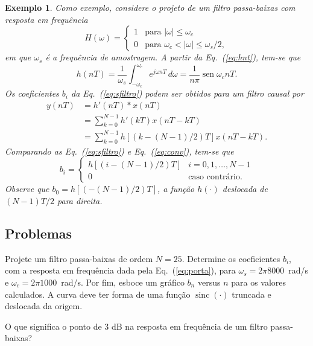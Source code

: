 \documentclass[12pt,addpoints]{exam}
\newtheorem{exemplo}{Exemplo}[section]
\begin{document}
\begin{exemplo} \label{ex:1}
    Como exemplo, considere o projeto de um filtro passa-baixas com resposta em frequência
    \begin{equation} \label{eq:porta}
        H(\omega) = \begin{cases}
        	1 & \text{para } |\omega| \leq \omega_c              \\
        	0 & \text{para } \omega_c < |\omega| \leq \omega_s/2,
        \end{cases}
    \end{equation}
    em que $\omega_s$ é a frequência de amostragem. A partir da Eq.~(\ref{eq:hnt}), tem-se que
    \begin{equation} \label{eq:hntfpb}
        h(nT) = \frac{1}{\omega_s} \int_{-\omega_c}^{\omega_c} e^{j\omega nT} \, d\omega = \frac{1}{n\pi} \operatorname{sen}{\omega_cnT}.
    \end{equation}
    Os coeficientes $b_i$ da Eq.~(\ref{eq:sfiltro}) podem ser obtidos para um filtro causal por
    \begin{equation} \label{eq:conv}
        \begin{split}
        	y(nT) & = h'(nT) * x(nT)                               \\
        	      & = \sum_{k=0}^{N-1} h'(kT)x(nT - kT)            \\
        	      & = \sum_{k=0}^{N-1} h[(k- (N-1)/2)T]x(nT - kT).
        \end{split}
    \end{equation}
    Comparando as Eq.~(\ref{eq:sfiltro}) e Eq.~(\ref{eq:conv}), tem-se que
    \begin{equation} \label{eq:bi}
        b_i = \begin{cases}
        	h[(i - (N-1)/2)T] & i = 0, 1, \ldots, N-1  \\
        	0                 & \text{caso contrário}.
        \end{cases}
    \end{equation}
    Observe que $b_0 = h[(-(N-1)/2)T]$, a função $h(\cdot)$ deslocada de $(N-1)T/2$ para direita.
\end{exemplo}

\subsection{Problemas}

\begin{questions}

\question Projete um filtro passa-baixas de ordem $N = 25$. Determine os coeficientes $b_i$, com a resposta em frequência dada pela Eq.~(\ref{eq:porta}), para $\omega_s = 2\pi 8000$~rad/s e $\omega_c = 2\pi 1000$~rad/s. Por fim, esboce um gráfico $b_n$ versus $n$ para os valores calculados. A curva deve ter forma de uma função $\operatorname{sinc}{(\cdot)}$ truncada e deslocada da origem.

\question O que significa o ponto de 3 dB na resposta em frequência de um filtro passa-baixas?

\end{questions}
\end{document}
